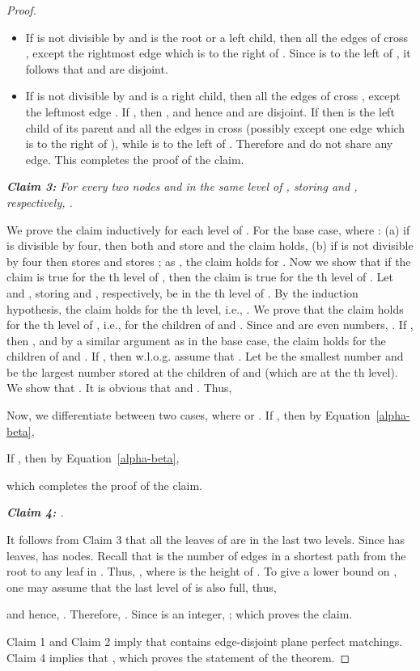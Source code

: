 \documentclass[11pt,a4paper]{article}
\begin{document}
\begin{proof}
\begin{itemize}
  \item If  is not divisible by  and  is the root or a left child, then all the edges of  cross , except the rightmost edge  which is to the right of . Since  is to the left of , it follows that  and  are disjoint. 

  \item If  is not divisible by  and  is a right child, then all the edges of  cross , except the leftmost edge . If , then , and hence  and  are disjoint. If  then  is the left child of its parent and all the edges in  cross  (possibly except one edge which is to the right of ), while  is to the left of . Therefore  and  do not share any edge. This completes the proof of the claim.
\end{itemize}
\vspace{10pt}

\vspace{10pt}
{\em {\bf Claim 3:} For every two nodes  and  in the same level of , storing  and , respectively, .}

We prove the claim inductively for each level  of . For the base case, where : (a) if  is divisible by four, then both  and  store  and the claim holds, (b) if  is not divisible by four then  stores  and  stores ; as , the claim holds for . 
Now we show that if the claim is true for the th level of , then the claim is true for the th level of .
Let  and , storing  and , respectively, be in the th level of . By the induction hypothesis, the claim holds for the th level, i.e., . We prove that the claim holds for the th level of , i.e., for the children of  and . Since  and  are even numbers, . If , then , and by a similar argument as in the base case, the claim holds for the children of  and . If , then w.l.o.g. assume that . Let  be the smallest number and  be the largest number stored at the children of  and  (which are at the th level). We show that . It is obvious that  and . Thus,

Now, we differentiate between two cases, where  or . If , then by Equation~\ref{alpha-beta},

If , then by Equation~\ref{alpha-beta},

which completes the proof of the claim.
\vspace{10pt}

\vspace{10pt}
{\em {\bf Claim 4:} .}

It follows from Claim 3 that all the leaves of  are in the last two levels. Since  has  leaves,  has  nodes. Recall that  is the number of edges in a shortest path from the root to any leaf in . Thus, , where  is the height of . To give a lower bound on , one may assume that the last level of  is also full, thus,


and hence, . Therefore, .  Since  is an integer, ; which proves the claim.

\vspace{20pt}

Claim 1 and Claim 2 imply that  contains  edge-disjoint plane perfect matchings. Claim 4 implies that , which proves the statement of the theorem.
\end{proof}
\end{document}
